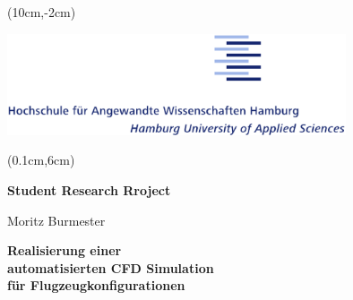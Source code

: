 \begin{titlepage}





\setlength{\parindent}{-2.5cm} %

  \begin{textblock*}{\textwidth}(10cm,-2cm)
    \begin{minipage}[r]{\textwidth}
      \includegraphics[width=10cm]{figures/HAW_logo.eps}%
    \end{minipage}
  \end{textblock*}

  \begin{textblock*}{\paperwidth}(0.1cm,6cm)
    \colorbox{HAWBannerColor}{
      \begin{minipage}[l][10cm][c]{\paperwidth}%
        \hspace*{0.25\textwidth}
        \parbox[t]{0.6\textwidth}{
          {\begin{flushright}
            
          {\bfseries\huge Student Research Rroject}

          \vspace{2cm}
          \Large Moritz Burmester

          \vspace{0.5cm}
          {\bfseries\LARGE Realisierung einer\\ automatisierten CFD Simulation\\ für Flugzeugkonfigurationen}
        \end{flushright}
        }}%
      \end{minipage}
    }
  \end{textblock*}

\vfill

{
  \setlength{\parindent}{0cm}
\calibriFont

}
\end{titlepage}
